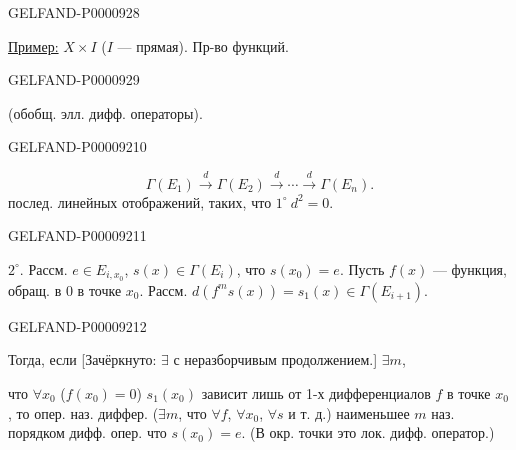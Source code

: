 \begin{GelfandAdjacentEvidence}{GELFAND-P000092}{8}

\underline{Пример:} $X\times I$ ($I$ — прямая). Пр-во функций.
\end{GelfandAdjacentEvidence}
\begin{GelfandAdjacentEvidence}{GELFAND-P000092}{9}

 (обобщ. элл. дифф. операторы).
\end{GelfandAdjacentEvidence}
\begin{GelfandAdjacentEvidence}{GELFAND-P000092}{10}

\begin{equation*}
\Gamma(E_1)\overset d\longrightarrow\Gamma(E_2)\overset d\longrightarrow
\cdots\overset d\longrightarrow\Gamma(E_n).
\end{equation*}
послед. линейных отображений, таких, что $1^\circ\ d^2=0$.
\end{GelfandAdjacentEvidence}
\begin{GelfandAdjacentEvidence}{GELFAND-P000092}{11}

$2^\circ$. Рассм. $e\in E_{i,x_0}$, $s(x)\in\Gamma(E_i)$, что $s(x_0)=e$.
Пусть $f(x)$ — функция, обращ. в $0$ в точке $x_0$.
Рассм. $d(f^m s(x))=s_1(x)\in\Gamma(E_{i+1})$.
\end{GelfandAdjacentEvidence}
\begin{GelfandAdjacentEvidence}{GELFAND-P000092}{12}

Тогда, если
[Зачёркнуто: $\exists$ с неразборчивым продолжением.] $\exists m$,

что $\forall x_0$ ($f(x_0)=0$) $s_1(x_0)$ зависит лишь от 1-х дифференциалов $f$
в точке $x_0$, то опер. наз. диффер.
($\exists m$, что $\forall f$, $\forall x_0$, $\forall s$ и т. д.)
наименьшее $m$ наз. порядком дифф. опер. что $s(x_0)=e$.
(В окр. точки это лок. дифф. оператор.)
\end{GelfandAdjacentEvidence}
